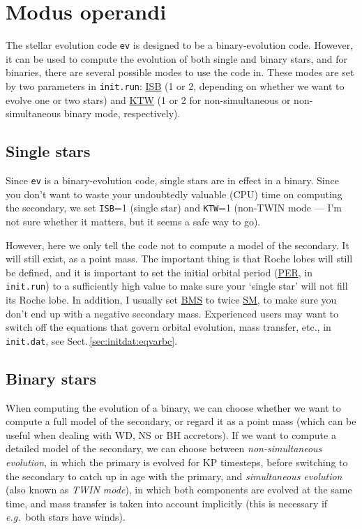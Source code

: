 \hypertarget{modus}{}
\section{Modus operandi}
\label{sec:modus}


The stellar evolution code \texttt{ev} is designed to be a binary-evolution code.  However, it can be used to
compute the evolution of both single and binary stars, and for binaries, there are several possible modes to
use the code in.  These modes are set by two parameters in \texttt{init.run}: \hyperlink{isb}{ISB} (1 or 2,
depending on whether we want to evolve one or two stars) and \hyperlink{ktw}{KTW} (1 or 2 for non-simultaneous 
or non-simultaneous binary mode, respectively).


\subsection{Single stars}

Since \texttt{ev} is a binary-evolution code, single stars are in effect in a binary.  Since you don't want to 
waste your undoubtedly valuable (CPU) time on computing the secondary, we set \texttt{ISB}=1 (single star) and
\texttt{KTW}=1 (non-TWIN mode --- I'm not sure whether it matters, but it seems a safe way to go).  

However, here we only tell the code not to compute a model of the secondary.  It will still exist, as a point
mass.  The important thing is that Roche lobes will still be defined, and it is important to set the initial orbital
period (\hyperlink{per}{PER}, in \texttt{init.run}) to a sufficiently high value to make sure your `single star'
will not fill its Roche lobe.  In addition, I usually set \hyperlink{bms}{BMS} to twice \hyperlink{sm}{SM}, to 
make sure you don't end up with a negative secondary mass.  Experienced users may want to switch off the equations 
that govern orbital evolution, mass transfer, etc., in \texttt{init.dat}, see Sect.\,\ref{sec:initdat:eqvarbc}.



\subsection{Binary stars}

When computing the evolution of a binary, we can choose whether we want to compute a full model of the secondary,
or regard it as a point mass (which can be useful when dealing with WD, NS or BH accretors).  If we want to 
compute a detailed model of the secondary, we can choose between \emph{non-simultaneous evolution}, in which the primary
is evolved for \hypertarget{kp}{KP} timesteps, before switching to the secondary to catch up in age with the primary,
and \emph{simultaneous evolution} (also known as \emph{TWIN mode}), in which both components are evolved at the same
time, and mass transfer is taken into account implicitly (this is necessary if \emph{e.g.}\ both stars have winds).


